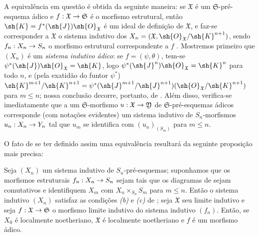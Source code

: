 \documentclass[oneside]{amsart}
\makeatletter
\renewcommand{\leq}{\leqslant}
\newcommand{\ega@arrow}[2]{\mathchoice{#1}{#2}{#2}{#2}}
\renewcommand{\to}{\ega@arrow{\longrightarrow}{\rightarrow}}
\newcommand{\oldpage}[2][]{{\marginnote{\normalfont\textbf{#1}~|~#2}}\ignorespaces}
\let\EGAOriginalLabel\label
\renewcommand{\label}[1]{\phantomsection\EGAOriginalLabel{#1}}
\makeatother
\begin{document}
A equivalência em questão é obtida da seguinte maneira:
se $\mathfrak{X}$ é um $\mathfrak{S}$-pré-esquema ádico e $f:\mathfrak{X}\to\mathfrak{S}$ é o morfismo estrutural, então $\sh{K}=f^*(\sh{J})\sh{O}_\mathfrak{X}$ é um ideal de definição de $\mathfrak{X}$, e faz-se corresponder a $\mathfrak{X}$ o sistema indutivo dos $X_n=(\mathfrak{X},\sh{O}_\mathfrak{X}/\sh{K}^{n+1})$, sendo $f_n:X_n\to S_n$ o morfismo estrutural correspondente a $f$ .
Mostremos primeiro que $(X_n)$ é um \emph{sistema indutivo ádico}:
se $f=(\psi,\theta)$, tem-se $\psi^*(\sh{J})\sh{O}_\mathfrak{X}=\sh{K}$, logo $\psi^*(\sh{J}^n)\sh{O}_\mathfrak{X}=\sh{K}^n$ para todo $n$, e (pela exatidão do funtor $\psi^*$) $\sh{K}^{m+1}/\sh{K}^{n+1}=\psi^*(\sh{J}^{m+1}/\sh{J}^{n+1})(\sh{O}_\mathfrak{X}/\sh{K}^{n+1})$ para $m\leq n$;
nossa conclusão decorre, portanto, de .
Além disso, verifica-se imediatamente que a um $\mathfrak{S}$-morfismo $u:\mathfrak{X}\to\mathfrak{Y}$ de $\mathfrak{S}$-pré-esquemas ádicos corresponde (com notações evidentes)
\oldpage[I]{207}
um sistema indutivo de $S_n$-morfismos $u_n:X_n\to Y_n$ tal que $u_m$ se identifica com $(u_n)_{(S_m)}$ para $m\leq n$.

O fato de se ter definido assim uma equivalência resultará da seguinte proposição mais precisa:

\begin{proposition}[10.12.3.1]
\label{I.10.12.3.1}
Seja $(X_n)$ um sistema indutivo de $S_n$-pré-esquemas;
suponhamos que os morfismos estruturais $f_n:X_n\to S_n$ sejam tais que os diagramas de  sejam comutativos e identifiquem $X_m$ com $X_n\times_{S_n}S_m$ para $m\leq n$.
Então o sistema indutivo $(X_n)$ satisfaz as condições \emph{(b)} e \emph{(c)} de ;
seja $\mathfrak{X}$ seu limite indutivo e seja $f:\mathfrak{X}\to\mathfrak{S}$ o morfismo limite indutivo do sistema indutivo $(f_n)$.
Então, se $X_0$ é localmente noetheriano, $\mathfrak{X}$ é localmente noetheriano e $f$ é um morfismo ádico.
\end{proposition}
\end{document}
